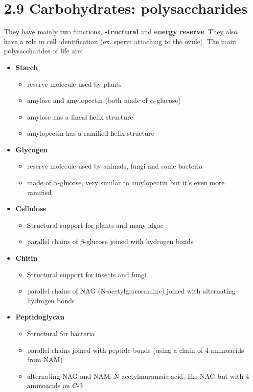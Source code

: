 \documentclass[a4paper,landscape,10pt]{cheatsheet}
\begin{document}
\section*{2.9 Carbohydrates: polysaccharides}
They have mainly two functions, \textbf{structural} and \textbf{energy reserve}. They also have a role in cell
identification (ex. sperm attaching to the ovule). The main polysaccharides of life are:
\begin{itemize}
      \item \textbf{Starch}
            \begin{itemize}
                  \item reserve molecule used by plants
                  \item amylose and amylopectin (both made of $\alpha$-glucose)
                  \item amylose has a lineal helix structure
                  \item amylopectin has a ramified helix structure
            \end{itemize}
      \item \textbf{Glycogen}
            \begin{itemize}
                  \item reserve molecule used by animals, fungi and some bacteria
                  \item made of $\alpha$-glucose, very similar to amylopectin but it's even more ramified
            \end{itemize}
      \item \textbf{Cellulose}
            \begin{itemize}
                  \item Structural support for plants and many algae
                  \item parallel chains of $\beta$-glucose joined with hydrogen bonds
            \end{itemize}
      \item \textbf{Chitin}
            \begin{itemize}
                  \item Structural support for insects and fungi
                  \item parallel chains of NAG (N-acetylglucosamine) joined with alternating hydrogen bonds
            \end{itemize}
      \item \textbf{Peptidoglycan}
            \begin{itemize}
                  \item Structural for bacteria
                  \item parallel chains joined with peptide bonds (using a chain of 4 aminoacids from NAM)
                  \item alternating NAG and NAM, N-acetylmuramaic acid, like NAG but with 4 aminoacids on C-3
            \end{itemize}
\end{itemize}
\end{document}
